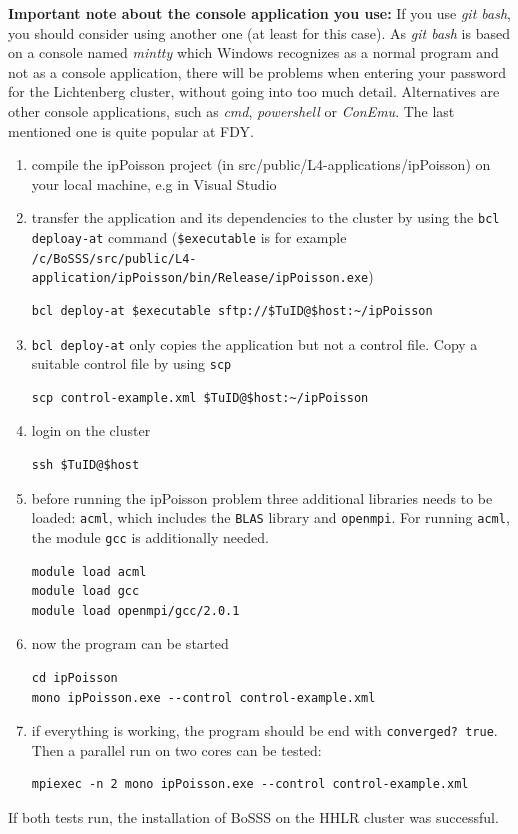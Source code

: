 \documentclass[11pt,twoside,a4paper]{fdyartcl}
\begin{document}
\textbf{Important note about the console application you use:} If you use \emph{git bash}, you should consider using another one (at least for this case). As \emph{git bash} is based on a console named \emph{mintty} which Windows recognizes as a normal program and not as a console application, there will be problems when entering your password for the Lichtenberg cluster, without going into too much detail. Alternatives are other console applications, such as \emph{cmd}, \emph{powershell} or \emph{ConEmu}. The last mentioned one is quite popular at FDY.

\begin{enumerate}
\item compile the ipPoisson project (in src/public/L4-applications/ipPoisson) on your local machine, e.g in Visual Studio
\item transfer the application and its dependencies to the cluster by using the \verb|bcl deploay-at| command (\verb|$executable| is for example\\
 \verb|/c/BoSSS/src/public/L4-application/ipPoisson/bin/Release/ipPoisson.exe|)
\begin{verbatim}
bcl deploy-at $executable sftp://$TuID@$host:~/ipPoisson
\end{verbatim}
\item \verb|bcl deploy-at| only copies the application but not a control file. Copy a suitable control file by using \verb|scp|
\begin{verbatim}
scp control-example.xml $TuID@$host:~/ipPoisson
\end{verbatim}
\item login on the cluster
\begin{verbatim}
ssh $TuID@$host
\end{verbatim}
\item before running the ipPoisson problem three additional libraries needs to be loaded: \verb|acml|, which includes the \verb|BLAS| library and \verb|openmpi|. For running \verb|acml|, the module \verb|gcc| is additionally needed.
\begin{verbatim}
module load acml
module load gcc
module load openmpi/gcc/2.0.1
\end{verbatim} 
\item now the program can be started
\begin{verbatim}
cd ipPoisson
mono ipPoisson.exe --control control-example.xml
\end{verbatim}
\item if everything is working, the program should be end with \verb|converged? true|. Then a parallel run on two cores can be tested:
\begin{verbatim}
mpiexec -n 2 mono ipPoisson.exe --control control-example.xml
\end{verbatim} 
\end{enumerate}
If both tests run, the installation of BoSSS on the HHLR cluster was successful.
\end{document}

